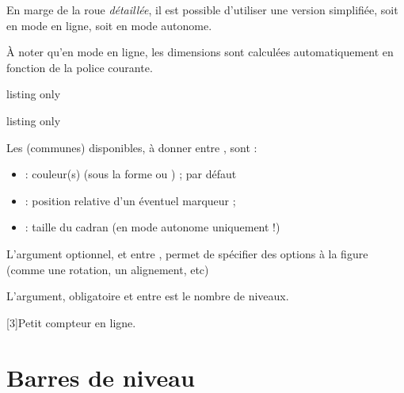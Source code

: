 \documentclass[french,11pt,a4paper]{article}
\begin{document}
En marge de la roue \textit{détaillée}, il est possible d'utiliser une version simplifiée, soit en mode en ligne, soit en mode autonome.

\smallskip

À noter qu'en mode en ligne, les dimensions sont calculées automatiquement en fonction de la police courante.

\begin{DemoCode}{listing only}
\end{DemoCode}

\begin{DemoCode}{listing only}
\end{DemoCode}

Les  (communes) disponibles, à donner entre \MontreCode{[...]}, sont :

\begin{itemize}
	\item {} : couleur(s) (sous la forme  ou ) ;  par défaut
	\item {} : position relative d'un éventuel marqueur ;
	\item {} : taille du cadran (en mode autonome uniquement !)
\end{itemize}

L'argument optionnel, et entre , permet de spécifier des options à la figure  (comme une rotation, un alignement, etc)

\smallskip

L'argument, obligatoire et entre  est le nombre de niveaux.

\begin{DemoCode}{}
\scalebox{3}[3]{Petit compteur  en ligne.}
\end{DemoCode}

\begin{DemoCode}{}
\end{DemoCode}

\pagebreak

\section{Barres de niveau}
\end{document}
